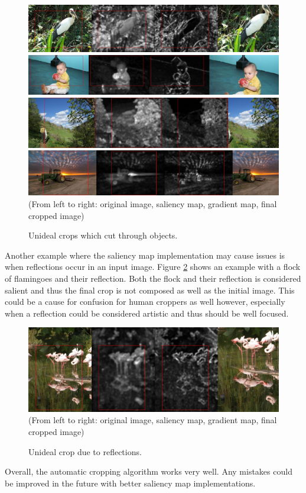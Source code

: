 \begin{figure}
\centering\includegraphics[width=0.9\columnwidth]{../figures/Chen_crops/cut_object/118697470_Large.jpg}
\vskip3pt
\centering\includegraphics[width=0.9\columnwidth]{../figures/Chen_crops/cut_object/1347846010_Large.jpg}
\vskip3pt
\centering\includegraphics[width=0.9\columnwidth]{../figures/Chen_crops/cut_object/490466578_Large.jpg}
\vskip3pt
\centering\includegraphics[width=0.9\columnwidth]{../figures/Chen_crops/cut_object/6853040778_Large.jpg}
\vskip3pt
\small{(From left to right: original image, saliency map, gradient map, final cropped image)}
\caption{Unideal crops which cut through objects.\label{fig:cropped_cutobject}}
\end{figure}

Another example where the saliency map implementation may cause issues is when
reflections occur in an input image.
Figure \ref{fig:cropped_reflection} shows an example with a flock of flamingoes
and their reflection.
Both the flock and their reflection is considered salient and thus the final
crop is not composed as well as the initial image.
This could be a cause for confusion for human croppers as well however,
especially when a reflection could be considered artistic and thus should be
well focused.

\begin{figure}
\centering\includegraphics[width=0.9\columnwidth]{../figures/Chen_crops/reflections/46152273_Large.jpg}
\vskip3pt
\small{(From left to right: original image, saliency map, gradient map, final cropped image)}
\caption{Unideal crop due to reflections.\label{fig:cropped_reflection}}
\end{figure}

Overall, the automatic cropping algorithm works very well.
Any mistakes could be improved in the future with better saliency map
implementations.


